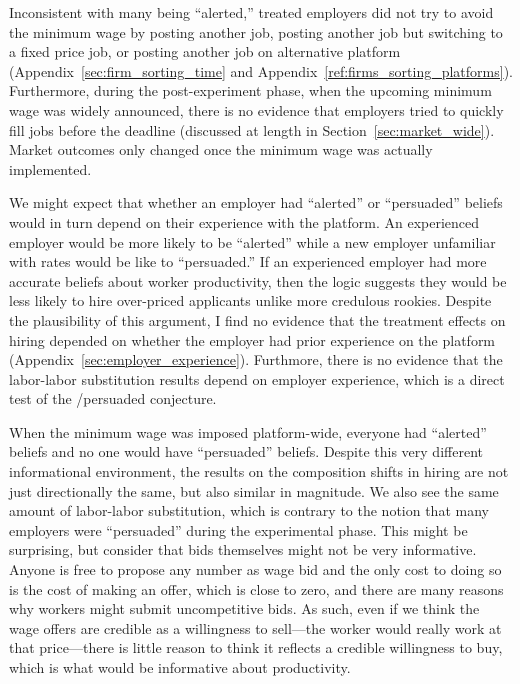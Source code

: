\documentclass[AER]{AEA}
\begin{document}
Inconsistent with many being ``alerted,'' treated employers did not try to avoid the minimum wage by posting another job, posting another job but switching to a fixed price job, or posting another job on alternative platform (Appendix~\ref{sec:firm_sorting_time} and Appendix~\ref{ref:firms_sorting_platforms}).
Furthermore, during the post-experiment phase, when the upcoming minimum wage was widely announced, there is no evidence that employers tried to quickly fill jobs before the deadline (discussed at length in Section~\ref{sec:market_wide}).
Market outcomes only changed once the minimum wage was actually implemented.

We might expect that whether an employer had ``alerted'' or ``persuaded'' beliefs would in turn depend on their experience with the platform.
An experienced employer would be more likely to be ``alerted'' while a new employer unfamiliar with rates would be like to ``persuaded.''
If an experienced employer had more accurate beliefs about worker productivity, then the \cite{wolinsky1983prices} logic suggests they would be less likely to hire over-priced applicants unlike more credulous rookies. 
Despite the plausibility of this argument, I find no evidence that the treatment effects on hiring depended on whether the employer had prior experience on the platform (Appendix~\ref{sec:employer_experience}).
Furthmore, there is no evidence that the labor-labor substitution results depend on employer experience, which is a direct test of the \cite{wolinsky1983prices}/persuaded conjecture. 


When the minimum wage was imposed platform-wide, everyone had ``alerted'' beliefs and no one would have ``persuaded'' beliefs.
Despite this very different informational environment, the results on the composition shifts in hiring are not just directionally the same, but also similar in magnitude.
We also see the same amount of labor-labor substitution, which is contrary to the notion that many employers were ``persuaded'' during the experimental phase. 
This might be surprising, but consider that bids themselves might not be very informative.
Anyone is free to propose any number as wage bid and the only cost to doing so is the cost of making an offer, which is close to zero, and there are many reasons why workers might submit uncompetitive bids.
As such, even if we think the wage offers are credible as a willingness to sell---the worker would really work at that price---there is little reason to think it reflects a credible willingness to buy, which is what would be informative about productivity.
\end{document}
